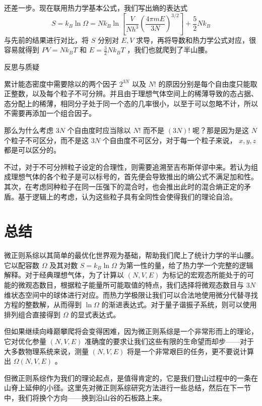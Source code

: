 还差一步。现在联用热力学基本公式，我们写出熵的表达式
\[
    S = k_B\ln \Omega = Nk_B \ln\left[ \frac{V}{N h^3} \left(\frac{4\pi mE}{3N} \right)^{3/2}  \right] + \frac{5}{2} N k_B
\]
与先前的结果进行对比，将 $S$ 分别对 $E,V$ 求导，再将导数和热力学公式对应，很容易就得到 $PV = Nk_B T$ 和 $E = \frac{3}{2}N k_BT$ ，我们也就爬到了半山腰。

\begin{justification}{\kaishu 反思与质疑}
    \kaishu \fontsize{11pt}{16pt}
    
    \quad\quad 累计能态密度中需要除以的两个因子 $2^{3N}$ 以及 $N!$ 的原因分别是每个自由度只能取正整数，以及每个粒子不可分辨。并且由于理想气体空间上的稀薄导致的态占据、态分配上的稀薄，相同分子处于同一个态的几率很小，以至于可以忽略不计，所以不需要再添加一个组合因子。

    \quad\quad 那么为什么考虑 $3N$ 个自由度时应当除以 $N!$ 而不是 $(3N)!$ 呢？那是因为是这 $N$ 个粒子不可区分，而不是这 $3N$ 个自由度不可区分，对于每一个粒子来说， $x, y, z$ 都是可以区分的。

    \quad\quad 不过，对于不可分辨粒子设定的合理性，则需要追溯至吉布斯佯谬中来。若认为组成理想气体的各个粒子是可以标号的，首先便会导致推出的熵公式不满足加和性。其次，在考虑同种粒子在同一压强下的混合时，也会推出此时的混合熵正定的矛盾\cite{Pathria}。基于逻辑上的考虑，认为这些粒子具有全同性会使得我们的理论自洽。
\end{justification}

\section{总结}\label{sec:微正则总结}

微正则系综以其简单的最优化世界观为基础，帮助我们爬上了统计力学的半山腰。它以配容数 $\Omega $ 及其对数 $S = k_B \ln \Omega$ 为第一性的量，给了热力学一个完整的逻辑解释。对于经典理想气体，为了计算以 $(N,V,E)$ 为标记的宏观态所能处于的可能的微观态数目，根据粒子能量所可能取值的特点，我们选择将微观态数目与 $3N$ 维状态空间中的球体进行对应。而热力学极限让我们可以合法地使用微分代替寻找方程的整数解，从而得到 $\ln \Omega$ 的渐进表达式。对于量子谐振子系统，则可以使用排列组合直接得到 $\Omega$ 的显式表达式。

但如果继续向峰巅攀爬将会变得困难，因为微正则系综是一个非常形而上的理论，它对优化参量 $(N,V,E)$ 准确度的要求让我们这些有限的生命望而却步——对于大多数物理系统来说，测量 $(N,V,E)$ 将是一个非常艰巨的任务，更不要说计算出 $\Omega(N,V,E)$ 。

但微正则系综作为我们的理论起点，是值得肯定的，它是我们登山过程中的一条在山脊上延伸的小径。这里先对微正则系综研究方法进行一些总结，然后在下一节中，我们将换个方向——换到沿山谷的石板路上来。


